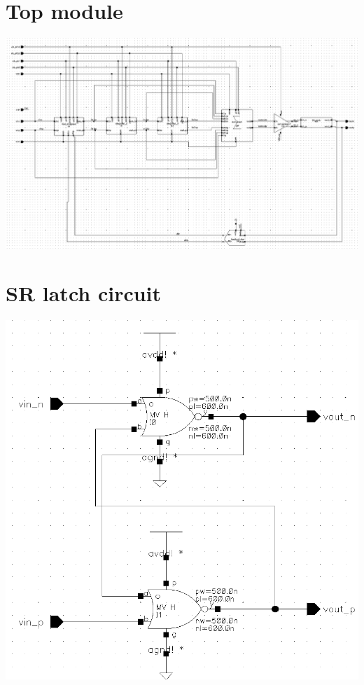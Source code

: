 \begin{appendices}
\section{Top module}
\label{app:top}
\begin{center}
\includegraphics[width=\textwidth]{images/top_module.png}
\end{center}

\section{SR latch circuit}
\label{app:SR}
\begin{center}
\includegraphics[width=\textwidth]{images/SR_latch_block.png}
\end{center}

\end{appendices}